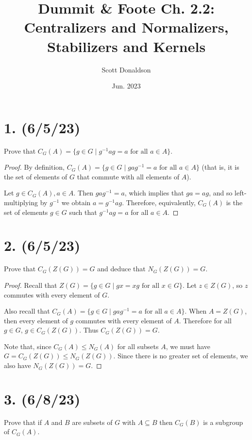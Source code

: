 \documentclass{article}
\title{Dummit \& Foote Ch. 2.2: Centralizers and Normalizers, Stabilizers and Kernels}
\author{Scott Donaldson}
\date{Jun. 2023}
\begin{document}
\maketitle

\section*{1. (6/5/23)}

Prove that $C_G(A) = \{ g \in G \mid g^{-1}ag = a \text{ for all } a \in A \}$.

\begin{proof}
    By definition, $C_G(A) = \{ g \in G \mid gag^{-1} = a \text{ for all } a \in A \}$ (that is, it is the set of elements of $G$ that commute with all elements of $A$).

    Let $g \in C_G(A), a \in A$. Then $gag^{-1} = a$, which implies that $ga = ag$, and so left-multiplying by $g^{-1}$ we obtain $a = g^{-1}ag$. Therefore, equivalently, $C_G(A)$ is the set of elements $g \in G$ such that $g^{-1}ag = a$ for all $a \in A$.
\end{proof}

\section*{2. (6/5/23)}

Prove that $C_G(Z(G)) = G$ and deduce that $N_G(Z(G)) = G$.

\begin{proof}
    Recall that $Z(G) = \{g \in G \mid gx = xg \text{ for all } x \in G \}$. Let $z \in Z(G)$, so $z$ commutes with every element of $G$.
    
    Also recall that $C_G(A) = \{ g \in G \mid gag^{-1} = a \text{ for all } a \in A \}$. When $A = Z(G)$, then every element of $g$ commutes with every element of $A$. Therefore for all $g \in G$, $g \in C_G(Z(G))$. Thus $C_G(Z(G)) = G$.

    Note that, since $C_G(A) \leq N_G(A)$ for all subsets $A$, we must have $G = C_G(Z(G)) \leq N_G(Z(G))$. Since there is no greater set of elements, we also have $N_G(Z(G)) = G$.
\end{proof}

\section*{3. (6/8/23)}

Prove that if $A$ and $B$ are subsets of $G$ with $A \subseteq B$ then $C_G(B)$ is a subgroup of $C_G(A)$.
\end{document}
